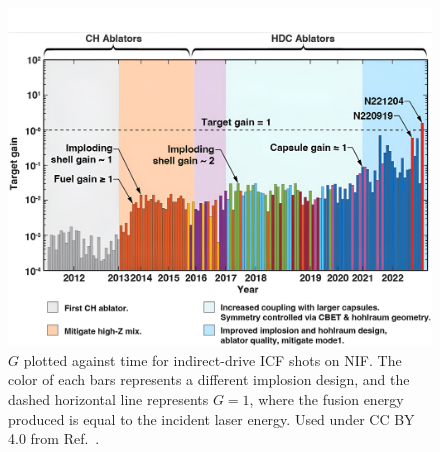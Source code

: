 \begin{figure}[t!]
    \includegraphics[width=\linewidth]{Introduction/Images/NIF_yields.jpg}
    \centering
    \caption{$G$ plotted against time for indirect-drive \ac{ICF} shots on \ac{NIF}.
    The color of each bars represents a different implosion design, and the dashed horizontal line represents $G=1$, where the fusion energy produced is equal to the incident laser energy.
    Used under CC BY 4.0 from Ref.~\cite{abu-shawareb_achievement_2024}.
    }%
    \label{fig:intro_nif_yields}
\end{figure}


